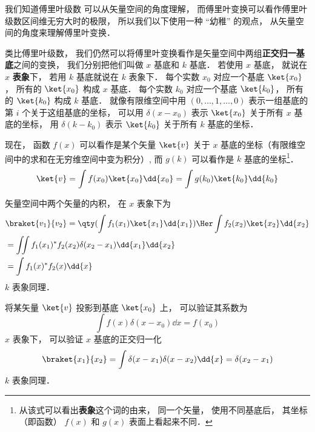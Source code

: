 

我们知道傅里叶级数 可以从矢量空间的角度理解， 而傅里叶变换可以看作傅里叶级数区间维无穷大时的极限， 所以我们以下使用一种 “幼稚” 的观点， 从矢量空间的角度来理解傅里叶变换．

类比傅里叶级数， 我们仍然可以将傅里叶变换看作是矢量空间中两组\textbf{正交归一基底}之间的变换， 我们分别把他们叫做 $x$ 基底和 $k$ 基底． 若使用 $x$ 基底， 就说在 $x$ \textbf{表象}下， 若用 $k$ 基底就说在 $k$ 表象下． 每个实数 $x_0$ 对应一个基底 $\ket {x_0}$， 所有的 $\ket{x_0}$ 构成 $x$ 基底． 每个实数 $k_0$ 对应一个基底 $\ket {k_0}$， 所有的 $\ket {k_0}$ 构成 $k$ 基底． 就像有限维空间中用 $(0, \dots , 1, \dots , 0)$ 表示一组基底的第 $i$ 个关于这组基底的坐标， 可以用 $\delta (x - x_0)$ 表示 $\ket {x_0}$ 关于所有 $x$ 基底的坐标， 用 $\delta (k - k_0)$ 表示 $\ket {k_0}$ 关于所有 $k$ 基底的坐标．

现在， 函数 $f(x)$ 可以看作是某个矢量 $\ket{v}$ 关于 $x$ 基底的坐标（有限维空间中的求和在无穷维空间中变为积分）, 而 $g(k)$ 可以看作是 $k$ 基底的坐标\footnote{从该式可以看出\textbf{表象}这个词的由来， 同一个矢量， 使用不同基底后， 其坐标（即函数） $f(x)$ 和 $g(x)$ 表面上看起来不同．}．
\begin{equation}
\ket{v} = \int f(x_0) \ket {x_0} \dd{x_0} = \int g(k_0) \ket {k_0} \dd{k_0}
\end{equation}

矢量空间中两个矢量的内积， 在 $x$ 表象下为
\begin{equation}
\begin{aligned}
&\braket{v_1}{v_2} = \qty(\int f_1(x_1) \ket{x_1} \dd{x_1})\Her  \int f_2(x_2) \ket{x_2} \dd{x_2}\\
&=\iint f_1(x_1)^* f_2(x_2) \delta (x_2 - x_1) \dd{x_1}\dd{x_2}\\
&=\int f_1(x)^* f_2(x) \dd{x}
\end{aligned}
\end{equation}
$k$ 表象同理．

将某矢量 $\ket{v}$ 投影到基底 $\ket{x_0}$ 上， 可以验证其系数为
\begin{equation}
\int f(x) \delta (x - x_0) \dd{x} = f(x_0)
\end{equation}
$x$ 表象下， 可以验证 $x$ 基底的正交归一化%
\begin{equation}
\braket{x_1}{x_2} = \int \delta (x - x_1) \delta (x - x_2) \dd{x} = \delta (x_2 - x_1)
\end{equation}
$k$ 表象同理．

